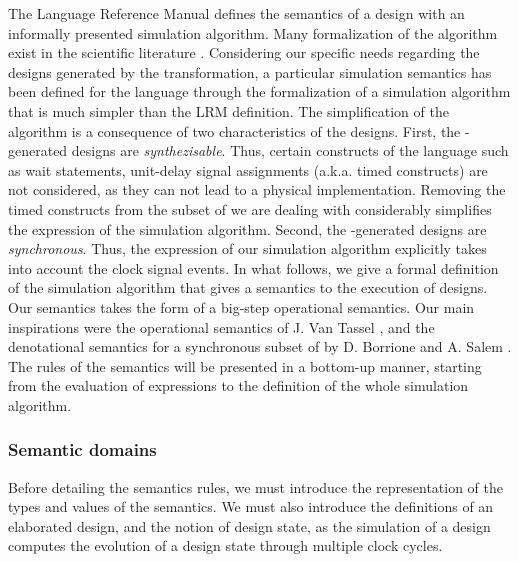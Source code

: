 \documentclass[pdflatex,sn-mathphys]{sn-jnl}%
\theoremstyle{thmstyleone}%
\theoremstyle{thmstyletwo}%
\theoremstyle{thmstylethree}%
\begin{document}
The \vhdl{} Language Reference Manual \cite{VHDL2000} defines the
semantics of a \vhdl{} design with an informally presented simulation
algorithm.  Many formalization of the algorithm exist in the
scientific
literature \cite{Borger1995,Borrione1995,Breuer1994,Breuer1995,Breuer1995a,Deharbe1995,Dohmen1995,Fuchs1995,Goossens1995,Kloos2012,Olcoz1995,Pandey1999,Reetz1995,Shankar1997,Thirunarayan2001,VanTassel1995}. Considering
our specific needs regarding the \vhdl{} designs generated by the
\hilecop{} transformation, a particular simulation semantics has been
defined for the \hvhdl{} language through the formalization of a
simulation algorithm that is much simpler than the LRM definition.
The simplification of the algorithm is a consequence of two
characteristics of the \hvhdl{} designs. First, the
\hilecop{}-generated \hvhdl{} designs are
\textit{synthezisable}. Thus, certain constructs of the \vhdl{}
language such as wait statements, unit-delay signal assignments
(a.k.a. timed constructs) are not considered, as they can not lead to
a physical implementation. Removing the timed constructs from the
subset of \vhdl{} we are dealing with considerably simplifies the
expression of the simulation algorithm. Second, the
\hilecop{}-generated \hvhdl{} designs are \textit{synchronous}. Thus,
the expression of our simulation algorithm explicitly takes into
account the clock signal events. In what follows, we give a formal
definition of the simulation algorithm that gives a semantics to the
execution of \hvhdl{} designs. Our semantics takes the form of a
big-step operational semantics. Our main inspirations were the
operational semantics of J. Van Tassel \cite{VanTassel1995}, and the
denotational semantics for a synchronous subset of \vhdl{} by
D. Borrione and A. Salem \cite{Borrione1995}. The rules of the
semantics will be presented in a bottom-up manner, starting from the
evaluation of expressions to the definition of the whole simulation
algorithm.

\subsubsection{Semantic domains}
\label{subsubsec:sem-domains}

Before detailing the semantics rules, we must introduce the
representation of the types and values of the semantics. We must also
introduce the definitions of an elaborated design, and the notion of
design state, as the simulation of a design computes the evolution of
a design state through multiple clock cycles.
\end{document}
